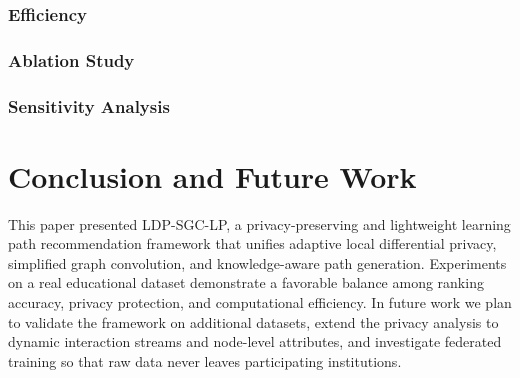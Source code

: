 \documentclass[sn-mathphys]{sn-jnl}
\begin{document}
\subsubsection{Efficiency}

\subsubsection{Ablation Study}

\subsubsection{Sensitivity Analysis}

\section{Conclusion and Future Work}
\label{sec:conc}
This paper presented LDP-SGC-LP, a privacy-preserving and lightweight learning path recommendation framework that unifies adaptive local differential privacy, simplified graph convolution, and knowledge-aware path generation. Experiments on a real educational dataset demonstrate a favorable balance among ranking accuracy, privacy protection, and computational efficiency. In future work we plan to validate the framework on additional datasets, extend the privacy analysis to dynamic interaction streams and node-level attributes, and investigate federated training so that raw data never leaves participating institutions.



\end{document}
